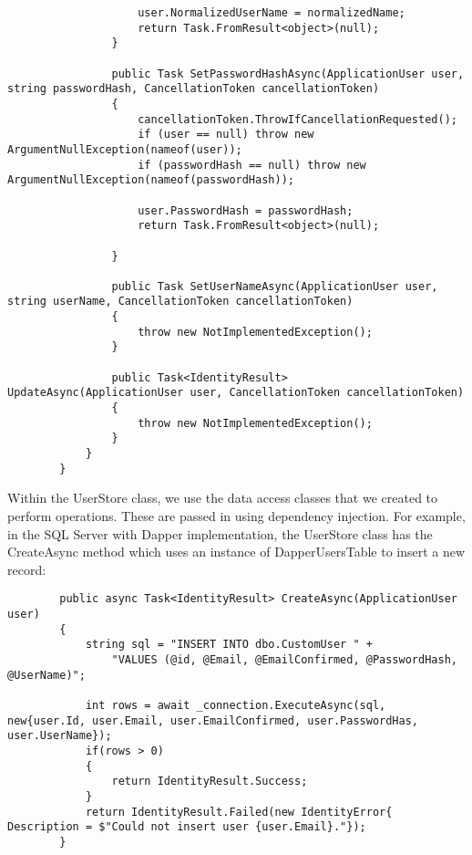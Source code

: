 \documentclass{report}
\begin{document}
\begin{lstlisting}
                    user.NormalizedUserName = normalizedName;
                    return Task.FromResult<object>(null);
                }

                public Task SetPasswordHashAsync(ApplicationUser user, string passwordHash, CancellationToken cancellationToken)
                {
                    cancellationToken.ThrowIfCancellationRequested();
                    if (user == null) throw new ArgumentNullException(nameof(user));
                    if (passwordHash == null) throw new ArgumentNullException(nameof(passwordHash));

                    user.PasswordHash = passwordHash;
                    return Task.FromResult<object>(null);

                }

                public Task SetUserNameAsync(ApplicationUser user, string userName, CancellationToken cancellationToken)
                {
                    throw new NotImplementedException();
                }

                public Task<IdentityResult> UpdateAsync(ApplicationUser user, CancellationToken cancellationToken)
                {
                    throw new NotImplementedException();
                }
            }
        }
    \end{lstlisting}

    Within the UserStore class, we use the data access classes that we created
    to perform operations. These are passed in using dependency injection. For
    example, in the SQL Server with Dapper implementation, the UserStore class
    has the CreateAsync method which uses an instance of DapperUsersTable to
    insert a new record:

    \lstset{style=sharpc}
    \begin{lstlisting}
        public async Task<IdentityResult> CreateAsync(ApplicationUser user)
        {
            string sql = "INSERT INTO dbo.CustomUser " +
                "VALUES (@id, @Email, @EmailConfirmed, @PasswordHash, @UserName)";
            
            int rows = await _connection.ExecuteAsync(sql, new{user.Id, user.Email, user.EmailConfirmed, user.PasswordHas, user.UserName});
            if(rows > 0)
            {
                return IdentityResult.Success;
            }
            return IdentityResult.Failed(new IdentityError{ Description = $"Could not insert user {user.Email}."});
        }
    \end{lstlisting}
\end{document}
